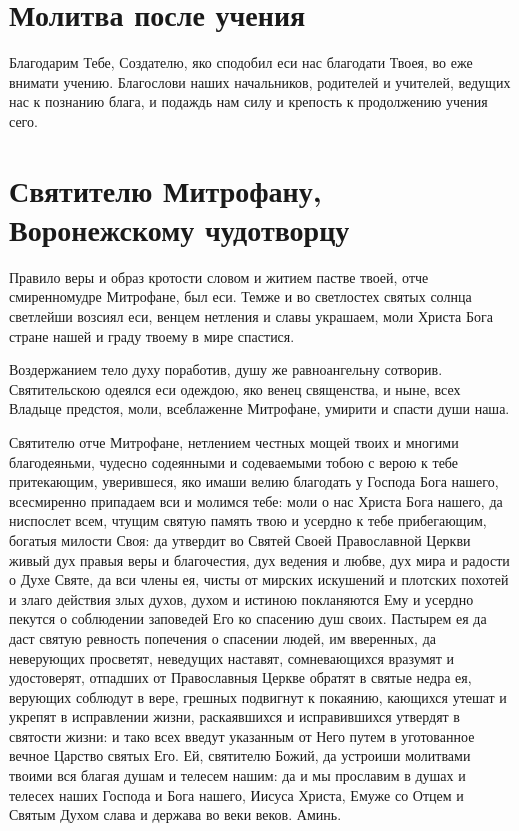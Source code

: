 \section{Молитва после учения}
 


Благодарим Тебе, Создателю, яко сподобил еси нас благодати Твоея, во еже внимати учению. Благослови наших начальников, родителей и учителей, ведущих нас к познанию блага, и подаждь нам силу и крепость к продолжению учения сего.
\mychapterending


 

\section{Святителю Митрофану, Воронежскому чудотворцу}
 


Правило веры и образ кротости словом и житием пастве твоей, отче смиренномудре Митрофане, был еси. Темже и во светлостех святых солнца светлейши возсиял еси, венцем нетления и славы украшаем, моли Христа Бога стране нашей и граду твоему в мире спастися.



Воздержанием тело духу поработив, душу же равноангельну сотворив. Святительскою одеялся еси одеждою, яко венец священства, и ныне, всех Владыце предстоя, моли, всеблаженне Митрофане, умирити и спасти души наша.



Святителю отче Митрофане, нетлением честных мощей твоих и многими благодеяньми, чудесно содеянными и содеваемыми тобою с верою к тебе притекающим, уверившеся, яко имаши велию благодать у Господа Бога нашего, всесмиренно припадаем вси и молимся тебе: моли о нас Христа Бога нашего, да ниспослет всем, чтущим святую память твою и усердно к тебе прибегающим, богатыя милости Своя: да утвердит во Святей Своей Православной Церкви живый дух правыя веры и благочестия, дух ведения и любве, дух мира и радости о Духе Святе, да вси члены ея, чисты от мирских искушений и плотских похотей и злаго действия злых духов, духом и истиною покланяются Ему и усердно пекутся о соблюдении заповедей Его ко спасению душ своих. Пастырем ея да даст святую ревность попечения о спасении людей, им вверенных, да неверующих просветят, неведущих наставят, сомневающихся вразумят и удостоверят, отпадших от Православныя Церкве обратят в святые недра ея, верующих соблюдут в вере, грешных подвигнут к покаянию, кающихся утешат и укрепят в исправлении жизни, раскаявшихся и исправившихся утвердят в святости жизни: и тако всех введут указанным от Него путем в уготованное вечное Царство святых Его. Ей, святителю Божий, да устроиши молитвами твоими вся благая душам и телесем нашим: да и мы прославим в душах и телесех наших Господа и Бога нашего, Иисуса Христа, Емуже со Отцем и Святым Духом слава и держава во веки веков. Аминь.\longpage{}\mychapterending

